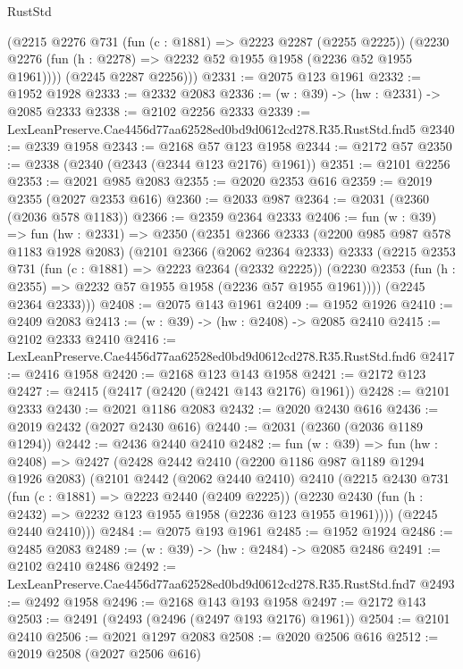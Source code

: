 \begin{lexlean}{RustStd}
\begin{coremodule}
        (@2215
          @2276
          @731
          (fun (c : @1881) => @2223 @2287 (@2255 @2225))
          (@2230 @2276 (fun (h : @2278) => @2232 @52 @1955 @1958 (@2236 @52 @1955 @1961))))
        (@2245 @2287 @2256)))
@2331 := @2075 @123 @1961
@2332 := @1952 @1928
@2333 := @2332 @2083
@2336 := (w : @39) -> (hw : @2331) -> @2085 @2333
@2338 := @2102 @2256 @2333
@2339 := LexLeanPreserve.Cae4456d77aa62528ed0bd9d0612cd278.R35.RustStd.fnd5
@2340 := @2339 @1958
@2343 := @2168 @57 @123 @1958
@2344 := @2172 @57
@2350 := @2338 (@2340 (@2343 (@2344 @123 @2176) @1961))
@2351 := @2101 @2256
@2353 := @2021 @985 @2083
@2355 := @2020 @2353 @616
@2359 := @2019 @2355 (@2027 @2353 @616)
@2360 := @2033 @987
@2364 := @2031 (@2360 (@2036 @578 @1183))
@2366 := @2359 @2364 @2333
@2406 := fun (w : @39) =>
  fun (hw : @2331) =>
  @2350
    (@2351
      @2366
      @2333
      (@2200 @985 @987 @578 @1183 @1928 @2083)
      (@2101
        @2366
        (@2062 @2364 @2333)
        @2333
        (@2215
          @2353
          @731
          (fun (c : @1881) => @2223 @2364 (@2332 @2225))
          (@2230 @2353 (fun (h : @2355) => @2232 @57 @1955 @1958 (@2236 @57 @1955 @1961))))
        (@2245 @2364 @2333)))
@2408 := @2075 @143 @1961
@2409 := @1952 @1926
@2410 := @2409 @2083
@2413 := (w : @39) -> (hw : @2408) -> @2085 @2410
@2415 := @2102 @2333 @2410
@2416 := LexLeanPreserve.Cae4456d77aa62528ed0bd9d0612cd278.R35.RustStd.fnd6
@2417 := @2416 @1958
@2420 := @2168 @123 @143 @1958
@2421 := @2172 @123
@2427 := @2415 (@2417 (@2420 (@2421 @143 @2176) @1961))
@2428 := @2101 @2333
@2430 := @2021 @1186 @2083
@2432 := @2020 @2430 @616
@2436 := @2019 @2432 (@2027 @2430 @616)
@2440 := @2031 (@2360 (@2036 @1189 @1294))
@2442 := @2436 @2440 @2410
@2482 := fun (w : @39) =>
  fun (hw : @2408) =>
  @2427
    (@2428
      @2442
      @2410
      (@2200 @1186 @987 @1189 @1294 @1926 @2083)
      (@2101
        @2442
        (@2062 @2440 @2410)
        @2410
        (@2215
          @2430
          @731
          (fun (c : @1881) => @2223 @2440 (@2409 @2225))
          (@2230 @2430 (fun (h : @2432) => @2232 @123 @1955 @1958 (@2236 @123 @1955 @1961))))
        (@2245 @2440 @2410)))
@2484 := @2075 @193 @1961
@2485 := @1952 @1924
@2486 := @2485 @2083
@2489 := (w : @39) -> (hw : @2484) -> @2085 @2486
@2491 := @2102 @2410 @2486
@2492 := LexLeanPreserve.Cae4456d77aa62528ed0bd9d0612cd278.R35.RustStd.fnd7
@2493 := @2492 @1958
@2496 := @2168 @143 @193 @1958
@2497 := @2172 @143
@2503 := @2491 (@2493 (@2496 (@2497 @193 @2176) @1961))
@2504 := @2101 @2410
@2506 := @2021 @1297 @2083
@2508 := @2020 @2506 @616
@2512 := @2019 @2508 (@2027 @2506 @616)

\end{coremodule}
\end{lexlean}
